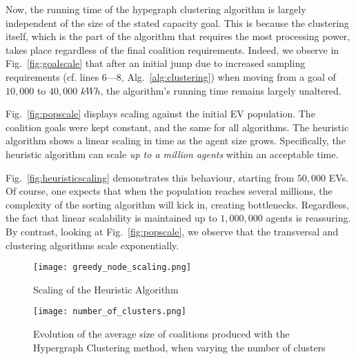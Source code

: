 Now, the running time of the hypegraph clustering algorithm is largely independent of the size of the stated capacity goal. 
This is because the clustering itself, which is the part of the algorithm that requires the most processing power, takes place regardless of the final coalition requirements.
Indeed, we observe in Fig.~\ref{fig:goalscale} that after an initial jump due to increased sampling requirements (cf. lines 6---8, Alg.~\ref{alg:clustering}) when moving from a goal of $10,000$ to $40,000$ $kWh$,
the algorithm's running time remains largely unaltered.


Fig.~\ref{fig:popscale} %
displays scaling against the initial EV population. The coalition goals were kept constant, and the same for all algorithms.
The heuristic algorithm shows a linear scaling in time as the agent size grows. Specifically, the heuristic algorithm can scale {\em up to a million agents} within an acceptable time. 


Fig.~\ref{fig:heuristicscaling} demonstrates this behaviour, starting from $50,000$ EVs. Of course, one expects that when the population reaches several millions, the complexity of the sorting algorithm will kick in, creating bottlenecks. Regardless, the fact that linear scalability is maintained up to $1,000,000$ agents is reassuring. By contrast, looking at Fig.~\ref{fig:popscale}, we observe that the transversal and clustering algorithms scale exponentially.

\begin{figure}
	\centering
	\begin{minipage}{.5\textwidth}
		\centering
		\texttt{[image: greedy\_node\_scaling.png]}
		
		\caption{Scaling of the Heuristic Algorithm\label{fig:heuristicscaling}}
		\vspace{20pt}
	\end{minipage}%
	\begin{minipage}{.5\textwidth}
		\texttt{[image: number\_of\_clusters.png]}
		\caption{Evolution of the average size of coalitions produced with the Hypergraph Clustering method, when varying the number of clusters\label{fig:clusterkscale}}
	\end{minipage}
\end{figure}



